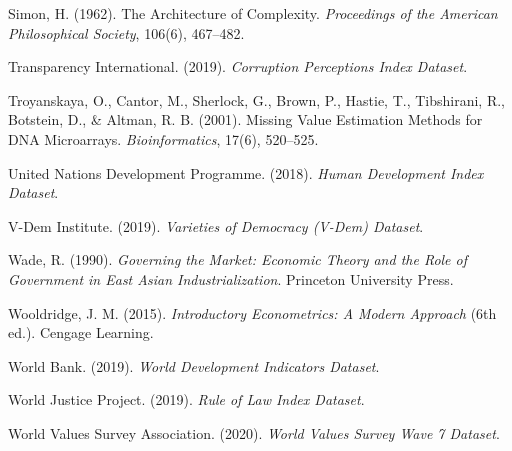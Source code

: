 \documentclass[12pt]{article}
\begin{document}
\begin{description}
\item Simon, H. (1962). The Architecture of Complexity. \textit{Proceedings of the American Philosophical Society}, 106(6), 467–482.

\item Transparency International. (2019). \textit{Corruption Perceptions Index Dataset}. 

\item Troyanskaya, O., Cantor, M., Sherlock, G., Brown, P., Hastie, T., Tibshirani, R., Botstein, D., \& Altman, R. B. (2001). Missing Value Estimation Methods for DNA Microarrays. \textit{Bioinformatics}, 17(6), 520–525.

\item United Nations Development Programme. (2018). \textit{Human Development Index Dataset}.

\item V-Dem Institute. (2019). \textit{Varieties of Democracy (V-Dem) Dataset}. 

\item Wade, R. (1990). \textit{Governing the Market: Economic Theory and the Role of Government in East Asian Industrialization}. Princeton University Press.

\item Wooldridge, J. M. (2015). \textit{Introductory Econometrics: A Modern Approach} (6th ed.). Cengage Learning.

\item World Bank. (2019). \textit{World Development Indicators Dataset}. 

\item World Justice Project. (2019). \textit{Rule of Law Index Dataset}. 

\item World Values Survey Association. (2020). \textit{World Values Survey Wave 7 Dataset}. 

\end{description}
\end{document}
